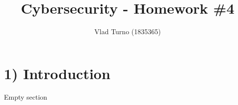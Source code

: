 \documentclass{article}
\title{Cybersecurity - Homework \#4}
\author{Vlad Turno (1835365)}
\begin{document}
\maketitle

\section*{1) Introduction}
Empty section
\end{document}
